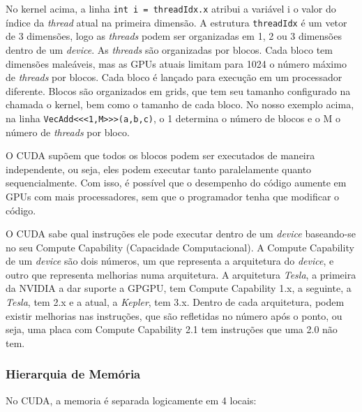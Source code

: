 No kernel acima, a linha \verb#int i = threadIdx.x# atribui a variável i o valor do índice da \textit{thread} atual na primeira dimensão. 
A estrutura \verb#threadIdx# é um vetor de 3 dimensões, logo as \textit{threads} podem ser organizadas em 1, 2 ou 3 dimensões dentro de um
\textit{device}. As \textit{threads} são organizadas por blocos. Cada bloco tem dimensões maleáveis, mas as GPUs atuais limitam para 1024 o 
número máximo de \textit{threads} por blocos. Cada bloco é lançado para execução em um processador diferente. Blocos são organizados em 
grids, que tem seu tamanho configurado na chamada o kernel, bem como o tamanho de cada bloco. No nosso exemplo acima, na linha
\verb#VecAdd<<<1,M>>>(a,b,c)#, o 1 determina o número de blocos e o M o número de \textit{threads} por bloco.

O CUDA supõem que todos os blocos podem ser executados de maneira independente, ou seja, eles podem executar tanto paralelamente
quanto sequencialmente. Com isso, é possível que o desempenho do código aumente em GPUs com mais processadores, sem que o programador
tenha que modificar o código.

O CUDA sabe qual instruções ele pode executar dentro de um \textit{device} baseando-se no seu Compute Capability 
(Capacidade Computacional). A Compute Capability de um \textit{device} são dois números, um que representa a arquitetura do 
\textit{device}, e outro que representa melhorias numa arquitetura.
A arquitetura \textit{Tesla}, a primeira da NVIDIA a dar suporte a GPGPU, tem Compute Capability 1.x, a seguinte, a \textit{Tesla},
tem 2.x e a atual, a \textit{Kepler}, tem 3.x. Dentro de cada arquitetura, podem existir melhorias nas instruções, que são
refletidas no número após o ponto, ou seja, uma placa com Compute Capability 2.1 tem instruções que uma 2.0 não tem.

\subsubsection{Hierarquia de Memória}
No CUDA, a memoria é separada logicamente em 4 locais:

